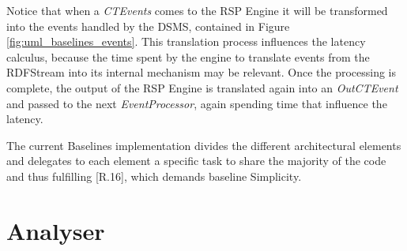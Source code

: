 Notice that when a \textit{CTEvents} comes to the RSP Engine it will be transformed into the events handled by the DSMS, contained in Figure \ref{fig:uml_baselines_events}. This translation process influences the latency calculus, because the time spent by the engine to translate events from the RDFStream into its internal mechanism may be relevant. Once the processing is complete, the output of the RSP Engine is translated again into an \textit{OutCTEvent} and passed to the next \textit{EventProcessor}, again spending time that influence the latency.

The current Baselines implementation divides the different architectural elements and delegates to each element a specific task to share the majority of the code and thus fulfilling [R.16], which demands baseline Simplicity.

%

\pagebreak

\section{Analyser}\label{sec:analyser-impl}

